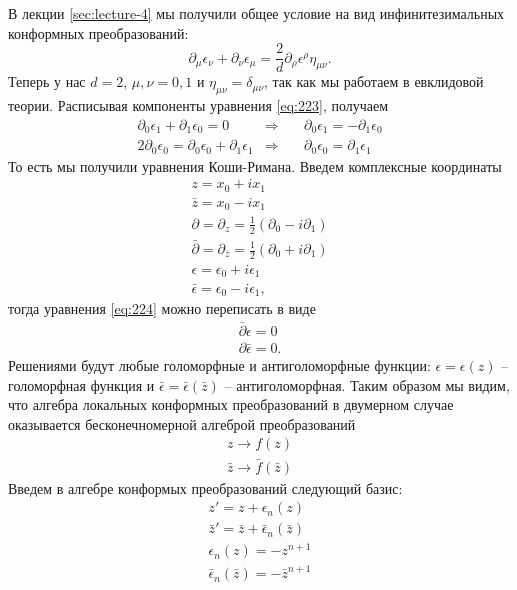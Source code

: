 \documentclass[a4paper,12pt]{article}
\theoremstyle{definition}
\theoremstyle{definition}
\theoremstyle{definition}
\begin{document}
В лекции \ref{sec:lecture-4} мы получили общее условие на вид инфинитезимальных конформных преобразований:
\begin{equation}
  \label{eq:223}
  \partial_{\mu}\epsilon_{\nu}+\partial_{\nu}\epsilon_{\mu}=\frac{2}{d} \partial_{\rho}\epsilon^{\rho} \eta_{\mu\nu}.
\end{equation}
Теперь у нас $d=2$, $\mu,\nu=0,1$ и $\eta_{\mu\nu}=\delta_{\mu\nu}$, так как мы работаем в
евклидовой теории. Расписывая компоненты уравнения \eqref{eq:223}, получаем 
\begin{eqnarray}
  \label{eq:224}
  \partial_{0} \epsilon_{1}+ \partial_{1}\epsilon_{0}=0& \Rightarrow & \quad\partial_{0} \epsilon_{1}=- \partial_{1}\epsilon_{0}\\
  2\partial_{0}\epsilon_{0}=\partial_{0}\epsilon_{0}+\partial_{1}\epsilon_{1}& \Rightarrow& \quad \partial_{0} \epsilon_{0}= \partial_{1}\epsilon_{1}
\end{eqnarray}
То есть мы получили уравнения Коши-Римана. Введем комплексные координаты
\begin{eqnarray}
  \label{eq:225}
  z=x_{0}+i x_{1}\\
  \bar z = x_{0}-i x_{1}\\
  \partial = \partial_{z}=\frac{1}{2}(\partial_{0}-i\partial_{1}) \\
  \bar \partial=\partial_{\bar z}=\frac{1}{2} (\partial_{0}+i \partial_{1})\\
  \epsilon=\epsilon_{0}+i \epsilon_{1}\\
  \bar \epsilon=\epsilon_{0}-i \epsilon_{1}, 
\end{eqnarray}
тогда уравнения \eqref{eq:224} можно переписать в виде
\begin{eqnarray}
  \label{eq:226}
 \bar \partial \epsilon=0\\
  \partial \bar \epsilon=0.
\end{eqnarray}
Решениями будут любые голоморфные и антиголоморфные функции: $\epsilon=\epsilon(z)$ -- голоморфная
функция и $\bar \epsilon=\bar \epsilon(\bar z)$ -- антиголоморфная. Таким образом мы видим, что
алгебра локальных конформных преобразований в двумерном случае оказывается бесконечномерной алгеброй
преобразований 
\begin{eqnarray}
  \label{eq:227}
  z\to f(z)\\
  \bar z \to \bar f(\bar z)
\end{eqnarray}
Введем в алгебре конформых преобразований следующий базис:
\begin{eqnarray}
  \label{eq:228}
  z'=z+\epsilon_{n}(z)\\
  \bar z'=\bar z+\bar \epsilon_{n}(\bar z)\\
  \epsilon_{n}(z)= -z^{n+1}\\
  \bar \epsilon_{n}(\bar z)=-\bar z^{n+1}
\end{eqnarray}
\end{document}
